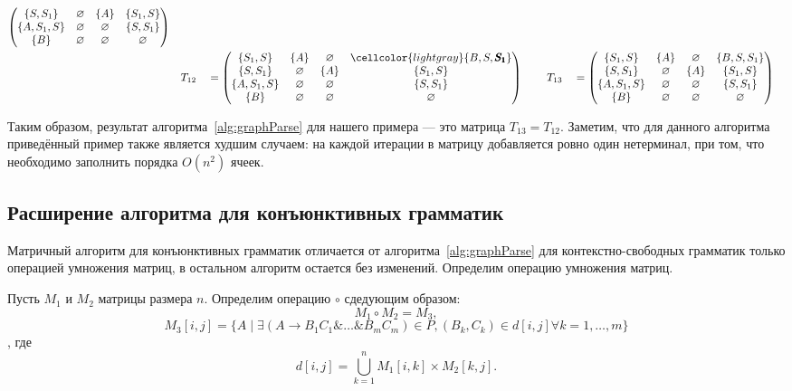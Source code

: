 \begin{example}
{\begin{alignat*}{7}
\begin{pmatrix}
\{S, S_1\}       & \varnothing & \{A\}       & \{S_1, S\}     \\
\{A, S_1, S\}  & \varnothing & \varnothing & \{S, S_1\} \\
\{B\}       & \varnothing & \varnothing & \varnothing \\
\end{pmatrix} \\ & &&T_{12} &&= \begin{pmatrix}
\{S_1, S\}     & \{A\}       & \varnothing & \cellcolor{lightgray} \{B, S, \pmb{S_1}\}    \\
\{S, S_1\}       & \varnothing & \{A\}       & \{S_1, S\}     \\
\{A, S_1, S\}  & \varnothing & \varnothing & \{S, S_1\} \\
\{B\}       & \varnothing & \varnothing & \varnothing \\
\end{pmatrix} \ \ \ \ &&T_{13} &&= \begin{pmatrix}
\{S_1, S\}     & \{A\}       & \varnothing & \{B, S, S_1\}    \\
\{S, S_1\}       & \varnothing & \{A\}       & \{S_1, S\}     \\
\{A, S_1, S\}  & \varnothing & \varnothing & \{S, S_1\} \\
\{B\}       & \varnothing & \varnothing & \varnothing \\
\end{pmatrix}
\end{alignat*}
}

Таким образом, результат алгоритма~\ref{alg:graphParse} для нашего примера --- это матрица $T_{13} = T_{12}$. Заметим, что для данного алгоритма приведённый пример также является худшим случаем: на каждой итерации в матрицу добавляется ровно один нетерминал, при том, что необходимо заполнить порядка $O(n^2)$ ячеек.

\end{example}


\subsection{Расширение алгоритма для конъюнктивных грамматик}

Матричный алгоритм для конъюнктивных грамматик отличается от алгоритма~\ref{alg:graphParse} для контекстно-свободных грамматик только операцией умножения матриц, в остальном алгоритм остается без изменений. Определим операцию умножения матриц.
\begin{definition}
    Пусть $M_1$ и $M_2$ матрицы размера $n$. Определим операцию $\circ$  сдедующим образом:
     $$M_1 \circ M_2 = M_3,$$ $$M_3 [i,j] = \{A \mid \exists (A \rightarrow B_1 C_1 \& \ldots \& B_m C_m) \in P, (B_k , C_k) \in d[i,j] \forall k = 1,\ldots,m\}$$, где $$d[i,j] = \bigcup_{k = 1}^{n} M_1 [i,k] \times M_2 [k,j].$$
\end{definition}

